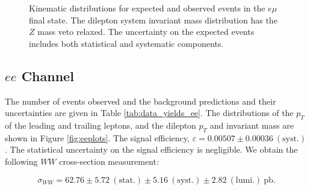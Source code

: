 \begin{figure}[!hbtp]
\begin{center}
\caption{Kinematic distributions for expected and observed events in the $e\mu$ final state.
The dilepton system invariant mass distribution has the $Z$ mass veto relaxed.
The uncertainty on the expected events includes both statistical and systematic components.}
\label{fig:emplots}
\end{center}
\end{figure}

%
%
%
\clearpage
\subsection{$ee$ Channel}

The number of events observed and the background predictions and their uncertainties are
given in Table \ref{tab:data_yields_ee}.
The distributions of the $p_{T}$ of the leading and trailing leptons, and the dilepton $p_{T}$
and invariant mass are shown in Figure \ref{fig:eeplots}.
The signal efficiency,  $\varepsilon = 0.00507 \pm 0.00036~\mathrm{(syst.)}$.
The statistical uncertainty on the signal efficiency is negligible.
We obtain the following $WW$ cross-section measurement:

\begin{equation*}
\sigma_{WW}  = 62.76 \pm 5.72~\mathrm{(stat.)} \pm 5.16~\mathrm{(syst.)} \pm 2.82~\mathrm{(lumi.)~pb}.
\end{equation*}

